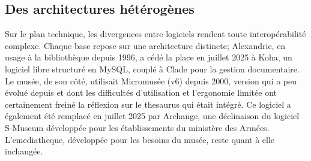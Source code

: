 \subsection{Des architectures hétérogènes}

Sur le plan technique, les divergences entre logiciels rendent toute interopérabilité complexe. Chaque base repose sur une architecture distincte; Alexandrie, en usage à la bibliothèque depuis 1996, a cédé la place en juillet 2025 à Koha, un logiciel libre structuré en MySQL, couplé à Clade pour la gestion documentaire. Le musée, de son côté, utilisait Micromusée (v6) depuis 2000, version qui a peu évolué depuis et dont les difficultés d'utilisation et l'ergonomie limitée ont certainement freiné la réflexion sur le \gls{thesaurus} qui était intégré. Ce logiciel a également été remplacé en juillet 2025 par Archange, une déclinaison du logiciel S-Museum développée pour les établissements du ministère des Armées. L'\gls{emediatheque}, développée pour les besoins du musée, reste quant à elle inchangée.

